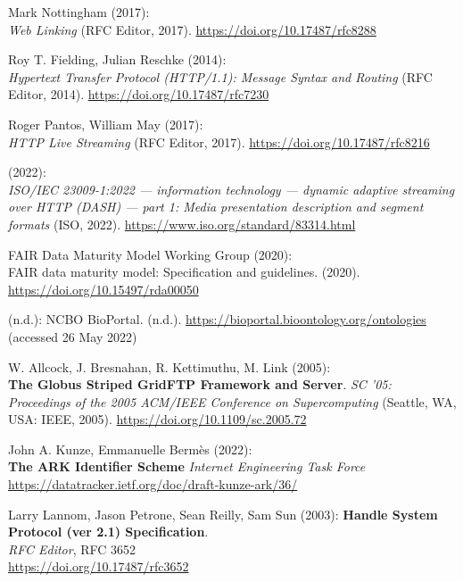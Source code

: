 \begin{thebibliography}{9}
Mark Nottingham (2017): \\
\emph{Web {Linking}} ({RFC Editor}, 2017).
\url{https://doi.org/10.17487/rfc8288}

Roy T. Fielding, Julian Reschke (2014): \\
\emph{Hypertext {Transfer
Protocol} ({HTTP}/1.1): {Message Syntax} and {Routing}} ({RFC Editor},
2014).
\url{https://doi.org/10.17487/rfc7230}

Roger Pantos, William May (2017): \\
\emph{{HTTP Live Streaming}} ({RFC
Editor}, 2017).
\url{https://doi.org/10.17487/rfc8216}

(2022): \\
\emph{{ISO}/{IEC} 23009-1:2022 --- information technology ---
dynamic adaptive streaming over HTTP (DASH) --- part 1: Media
presentation description and segment formats} ({ISO}, 2022).
\url{https://www.iso.org/standard/83314.html}

FAIR Data Maturity Model Working Group (2020): \\
{FAIR} data maturity
model: {Specification} and guidelines. (2020).
\url{https://doi.org/10.15497/rda00050}

(n.d.): {NCBO BioPortal}. (n.d.).
\url{https://bioportal.bioontology.org/ontologies} (accessed 26 May
2022)

W. Allcock, J. Bresnahan, R. Kettimuthu, M. Link (2005): \\
\textbf{The
{Globus Striped GridFTP Framework} and {Server}}. \emph{{SC '05:
Proceedings of the 2005 ACM/IEEE Conference on Supercomputing}}
({Seattle, WA, USA}: {IEEE}, 2005).
\url{https://doi.org/10.1109/sc.2005.72}

John A. Kunze, Emmanuelle Bermès (2022): \\
\textbf{{The ARK Identifier Scheme}} 
\emph{Internet Engineering Task Force}\\
\url{https://datatracker.ietf.org/doc/draft-kunze-ark/36/}

Larry Lannom, Jason Petrone, Sean Reilly, Sam Sun (2003):
\textbf{Handle {System Protocol} (ver 2.1) {Specification}}.\\
\emph{RFC Editor}, RFC 3652\\
\url{https://doi.org/10.17487/rfc3652}


\end{thebibliography}
